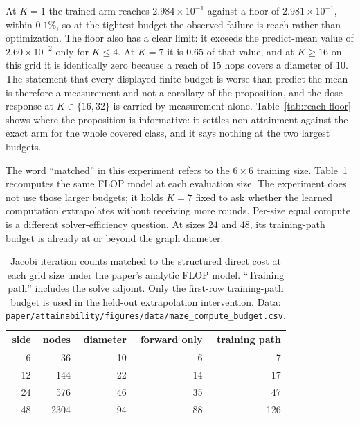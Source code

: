 At $K=1$ the trained arm reaches $2.984\times10^{-1}$ against a floor of
$2.981\times10^{-1}$, within $0.1\%$, so at the tightest budget the observed
failure is reach rather than optimization. The floor also has a clear limit:
it exceeds the predict-mean value of $2.60\times10^{-2}$ only
for $K\leq4$. At $K=7$ it is $0.65$ of that value, and at $K\geq16$ on this
grid it is identically zero because a reach of $15$ hops covers a diameter of
$10$. The statement that every displayed finite budget is worse than
predict-the-mean is therefore a measurement and not a corollary of the
proposition, and the dose-response at $K\in\{16,32\}$ is carried by measurement
alone. Table~\ref{tab:reach-floor} shows where the proposition is informative:
it settles non-attainment against the exact arm for the whole covered class,
and it says nothing at the two largest budgets.

The word ``matched'' in this experiment refers to the $6\times6$ training
size. Table~\ref{tab:maze-compute-scaling} recomputes the same FLOP model at
each evaluation size. The experiment does not use those larger budgets; it
holds $K=7$ fixed to ask whether the learned computation extrapolates without
receiving more rounds. Per-size equal compute is a different solver-efficiency
question. At sizes $24$ and $48$, its training-path budget is already at or
beyond the graph diameter.

\begin{table}[htbp]
  \centering
  \caption{Jacobi iteration counts matched to the structured direct cost at
  each grid size under the paper's analytic FLOP model. ``Training path''
  includes the solve adjoint. Only the first-row training-path budget is used
  in the held-out extrapolation intervention. Data:
  \href{https://github.com/vanshsehrawat14/gabp-sparse-inv/blob/main/paper/attainability/figures/data/maze_compute_budget.csv}
{\nolinkurl{paper/attainability/figures/data/maze_compute_budget.csv}}.}
  \label{tab:maze-compute-scaling}
  \begin{tabular}{rrrrr}
    \toprule
    side & nodes & diameter & forward only & training path \\
    \midrule
    6  & 36   & 10 & 6  & 7 \\
    12 & 144  & 22 & 14 & 17 \\
    24 & 576  & 46 & 35 & 47 \\
    48 & 2304 & 94 & 88 & 126 \\
    \bottomrule
  \end{tabular}
\end{table}


